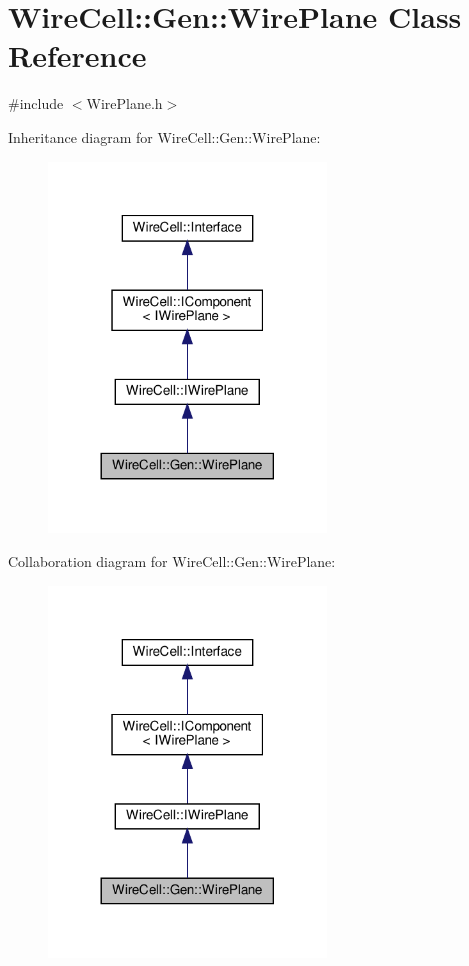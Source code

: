 \hypertarget{class_wire_cell_1_1_gen_1_1_wire_plane}{}\section{Wire\+Cell\+:\+:Gen\+:\+:Wire\+Plane Class Reference}
\label{class_wire_cell_1_1_gen_1_1_wire_plane}


{\ttfamily \#include $<$Wire\+Plane.\+h$>$}



Inheritance diagram for Wire\+Cell\+:\+:Gen\+:\+:Wire\+Plane\+:
\nopagebreak
\begin{figure}[H]
\begin{center}
\leavevmode
\includegraphics[width=209pt]{class_wire_cell_1_1_gen_1_1_wire_plane__inherit__graph}
\end{center}
\end{figure}


Collaboration diagram for Wire\+Cell\+:\+:Gen\+:\+:Wire\+Plane\+:
\nopagebreak
\begin{figure}[H]
\begin{center}
\leavevmode
\includegraphics[width=209pt]{class_wire_cell_1_1_gen_1_1_wire_plane__coll__graph}
\end{center}
\end{figure}
